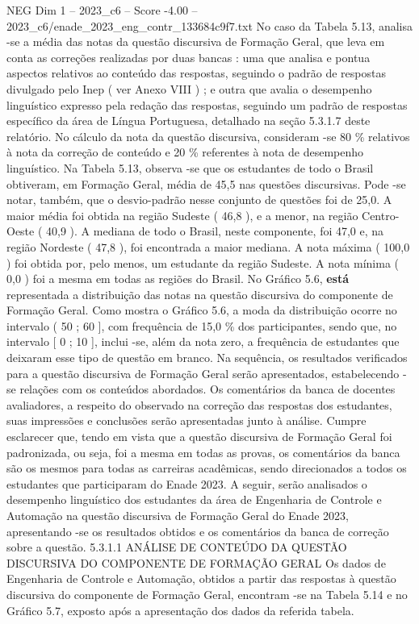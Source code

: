\begin{textsample}{NEG Dim 1 – 2023\_c6 – Score -4.00 – 2023\_c6/enade\_2023\_eng\_contr\_133684c9f7.txt}
No caso da Tabela 5.13, analisa -se a média das notas da questão discursiva de Formação Geral, que leva em conta as correções realizadas por duas bancas : uma que analisa e pontua aspectos relativos ao conteúdo das respostas, seguindo o padrão de respostas divulgado pelo Inep ( ver Anexo VIII ) ; e outra que avalia o desempenho linguístico expresso pela redação das respostas, seguindo um padrão de respostas específico da área de Língua Portuguesa, detalhado na seção 5.3.1.7 deste relatório.
No cálculo da nota da questão discursiva, consideram -se 80 \% relativos à nota da correção de conteúdo e 20 \% referentes à nota de desempenho linguístico.
Na Tabela 5.13, observa -se que os estudantes de todo o Brasil obtiveram, em Formação Geral, média de 45,5 nas questões discursivas.
Pode -se notar, também, que o desvio-padrão nesse conjunto de questões foi de 25,0.
A maior média foi obtida na região Sudeste ( 46,8 ), e a menor, na região Centro-Oeste ( 40,9 ).
A mediana de todo o Brasil, neste componente, foi 47,0 e, na região Nordeste ( 47,8 ), foi encontrada a maior mediana.
A nota máxima ( 100,0 ) foi obtida por, pelo menos, um estudante da região Sudeste.
A nota mínima ( 0,0 ) foi a mesma em todas as regiões do Brasil.
No Gráfico 5.6, \textbf{está} representada a distribuição das notas na questão discursiva do componente de Formação Geral.
Como mostra o Gráfico 5.6, a moda da distribuição ocorre no intervalo ( 50 ; 60 ], com frequência de 15,0 \% dos participantes, sendo que, no intervalo [ 0 ; 10 ], inclui -se, além da nota zero, a frequência de estudantes que deixaram esse tipo de questão em branco.
Na sequência, os resultados verificados para a questão discursiva de Formação Geral serão apresentados, estabelecendo -se relações com os conteúdos abordados.
Os comentários da banca de docentes avaliadores, a respeito do observado na correção das respostas dos estudantes, suas impressões e conclusões serão apresentadas junto à análise.
Cumpre esclarecer que, tendo em vista que a questão discursiva de Formação Geral foi padronizada, ou seja, foi a mesma em todas as provas, os comentários da banca são os mesmos para todas as carreiras acadêmicas, sendo direcionados a todos os estudantes que participaram do Enade 2023.
A seguir, serão analisados o desempenho linguístico dos estudantes da área de Engenharia de Controle e Automação na questão discursiva de Formação Geral do Enade 2023, apresentando -se os resultados obtidos e os comentários da banca de correção sobre a questão. 5.3.1.1 ANÁLISE DE CONTEÚDO DA QUESTÃO DISCURSIVA DO COMPONENTE DE FORMAÇÃO GERAL Os dados de Engenharia de Controle e Automação, obtidos a partir das respostas à questão discursiva do componente de Formação Geral, encontram -se na Tabela 5.14 e no Gráfico 5.7, exposto após a apresentação dos dados da referida tabela.

\end{textsample}
